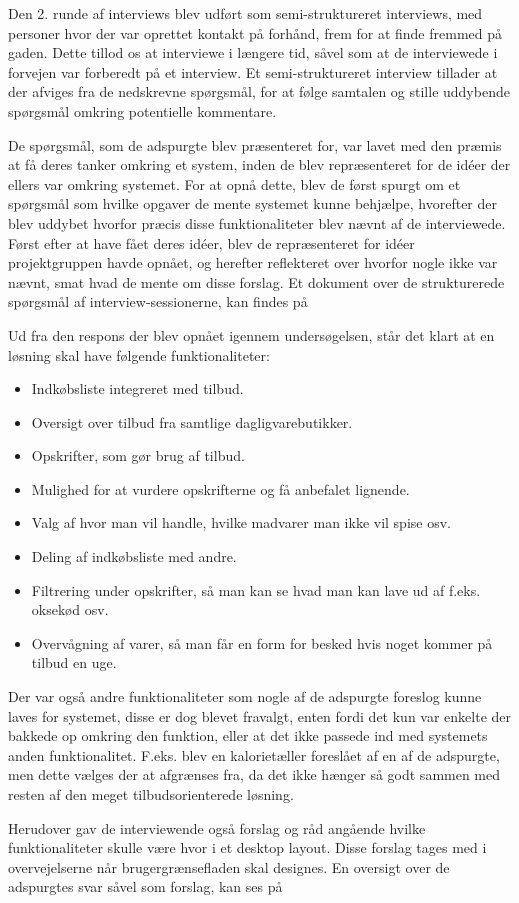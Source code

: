 Den 2. runde af interviews blev udført som semi-struktureret interviews, med personer hvor der var oprettet kontakt på forhånd, frem for at finde fremmed på gaden.
Dette tillod os at interviewe i længere tid, såvel som at de interviewede i forvejen var forberedt på et interview.
Et semi-struktureret interview tillader at der afviges fra de nedskrevne spørgsmål, for at følge samtalen og stille uddybende spørgsmål omkring potentielle kommentare.

De spørgsmål, som de adspurgte blev præsenteret for, var lavet med den præmis at få deres tanker omkring et system, inden de blev repræsenteret for de idéer der ellers var omkring systemet.
For at opnå dette, blev de først spurgt om et spørgsmål som hvilke opgaver de mente systemet kunne behjælpe, hvorefter der blev uddybet hvorfor præcis disse funktionaliteter blev nævnt af de interviewede.
Først efter at have fået deres idéer, blev de repræsenteret for idéer projektgruppen havde opnået, og herefter reflekteret over hvorfor nogle ikke var nævnt, smat hvad de mente om disse forslag.
Et dokument over de strukturerede spørgsmål af interview-sessionerne, kan findes på \myref{}%

Ud fra den respons der blev opnået igennem undersøgelsen, står det klart at en løsning skal have følgende funktionaliteter:

\begin{itemize}
	\item Indkøbsliste integreret med tilbud.
	\item Oversigt over tilbud fra samtlige dagligvarebutikker.
	\item Opskrifter, som gør brug af tilbud.
	\item Mulighed for at vurdere opskrifterne og få anbefalet lignende.
	\item Valg af hvor man vil handle, hvilke madvarer man ikke vil spise osv.
	\item Deling af indkøbsliste med andre.
	\item Filtrering under opskrifter, så man kan se hvad man kan lave ud af f.eks. oksekød osv.
	\item Overvågning af varer, så man får en form for besked hvis noget kommer på tilbud en uge.
\end{itemize}

Der var også andre funktionaliteter som nogle af de adspurgte foreslog kunne laves for systemet, disse er dog blevet fravalgt, enten fordi det kun var enkelte der bakkede op omkring den funktion, eller at det ikke passede ind med systemets anden funktionalitet.
F.eks. blev en kalorietæller foreslået af en af de adspurgte, men dette vælges der at afgrænses fra, da det ikke hænger så godt sammen med resten af den meget tilbudsorienterede løsning.

Herudover gav de interviewende også forslag og råd angående hvilke funktionaliteter skulle være hvor i et desktop layout.
Disse forslag tages med i overvejelserne når brugergrænsefladen skal designes.
En oversigt over de adspurgtes svar såvel som forslag, kan ses på \myref{}%
